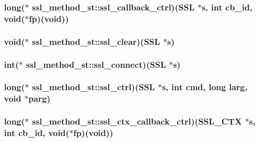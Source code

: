 \hypertarget{structssl__method__st_ae06b89c1fdedc882823062374b095966}{
\subsubsection[{ssl\-\_\-callback\-\_\-ctrl}]{\setlength{\rightskip}{0pt plus 5cm}long($\ast$ ssl\-\_\-method\-\_\-st\-::ssl\-\_\-callback\-\_\-ctrl)(S\-S\-L $\ast$s, int cb\-\_\-id, void($\ast$fp)(void))}}\label{structssl__method__st_ae06b89c1fdedc882823062374b095966}
\hypertarget{structssl__method__st_ae0c4287f13aabdbbb14ce63c48e820b2}{
\subsubsection[{ssl\-\_\-clear}]{\setlength{\rightskip}{0pt plus 5cm}void($\ast$ ssl\-\_\-method\-\_\-st\-::ssl\-\_\-clear)(S\-S\-L $\ast$s)}}\label{structssl__method__st_ae0c4287f13aabdbbb14ce63c48e820b2}
\hypertarget{structssl__method__st_a6280860fde4074f8df0a2daf7bf211a5}{
\subsubsection[{ssl\-\_\-connect}]{\setlength{\rightskip}{0pt plus 5cm}int($\ast$ ssl\-\_\-method\-\_\-st\-::ssl\-\_\-connect)(S\-S\-L $\ast$s)}}\label{structssl__method__st_a6280860fde4074f8df0a2daf7bf211a5}
\hypertarget{structssl__method__st_a05895fdcc347e26857903f4e9ab1fd30}{
\subsubsection[{ssl\-\_\-ctrl}]{\setlength{\rightskip}{0pt plus 5cm}long($\ast$ ssl\-\_\-method\-\_\-st\-::ssl\-\_\-ctrl)(S\-S\-L $\ast$s, int cmd, long larg, void $\ast$parg)}}\label{structssl__method__st_a05895fdcc347e26857903f4e9ab1fd30}
\hypertarget{structssl__method__st_a6b2c364ace489ef1953b2a5092612b0e}{
\subsubsection[{ssl\-\_\-ctx\-\_\-callback\-\_\-ctrl}]{\setlength{\rightskip}{0pt plus 5cm}long($\ast$ ssl\-\_\-method\-\_\-st\-::ssl\-\_\-ctx\-\_\-callback\-\_\-ctrl)(S\-S\-L\-\_\-\-C\-T\-X $\ast$s, int cb\-\_\-id, void($\ast$fp)(void))}}\label{structssl__method__st_a6b2c364ace489ef1953b2a5092612b0e}
